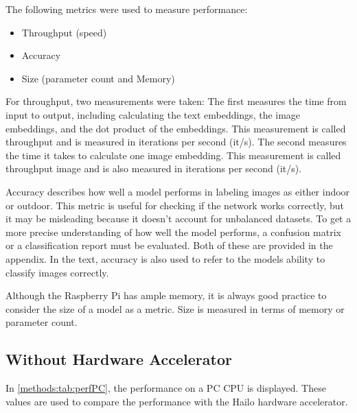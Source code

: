 The following metrics were used to measure performance:
\begin{itemize}
    \item Throughput (speed)
    \item Accuracy
    \item Size (parameter count and Memory)
\end{itemize}

For throughput, two measurements were taken:
The first measures the time from input to output, including calculating the text embeddings, the image embeddings, and the dot product of the embeddings. This measurement is called throughput and is measured in iterations per second (it/s).
The second measures the time it takes to calculate one image embedding. This measurement is called throughput image and is also measured in iterations per second (it/s).

Accuracy describes how well a model performs in labeling images as either indoor or outdoor. This metric is useful for checking if the network works correctly, but it may be misleading because it doesn't account for unbalanced datasets. To get a more precise understanding of how well the model performs, a confusion matrix or a classification report must be evaluated. Both of these are provided in the appendix. In the text, accuracy is also used to refer to the models ability to classify images correctly.

Although the Raspberry Pi has ample memory, it is always good practice to consider the size of a model as a metric. Size is measured in terms of memory or parameter count.

\subsection{Without Hardware Accelerator}
In \cref{methods:tab:perfPC}, the performance on a PC CPU is displayed. These values are used to compare the performance with the Hailo hardware accelerator.

